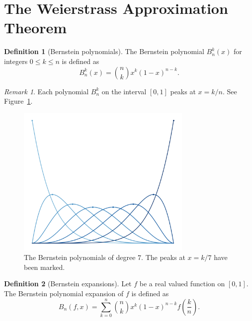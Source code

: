 \documentclass[11pt]{article}
\theoremstyle{definition}
\newtheorem{definition}{Definition}[section]
\theoremstyle{remark}
\newtheorem*{remark}{Remark}
\begin{document}
    \section{The Weierstrass Approximation Theorem}
    \begin{definition}[Bernstein polynomials]
        The Bernstein polynomial $B_n^k(x)$ for integers $0 \leq k \leq n$ is defined
        as \[
            B_n^k(x) = \binom{n}{k} x^k (1 - x)^{n - k}.
        \] 
    \end{definition}
    \begin{remark}
        Each polynomial $B_n^k$ on the interval $[0, 1]$ peaks at $x = k / n$. See
        Figure~\ref{fig:bernstein_7}.
    \end{remark}
    \begin{figure}
        \centering
        \includegraphics[width=0.75\textwidth]{./img/bernstein_7.png}
        \caption{The Bernstein polynomials of degree $7$. The peaks at $x = k / 7$ have
        been marked.}
        \label{fig:bernstein_7}
    \end{figure}

    \begin{definition}[Bernstein expansions]
        Let $f$ be a real valued function on $[0, 1]$. The Bernstein polynomial
        expansion of $f$ is defined as \[
            B_n(f, x) = \sum_{k = 0}^n \binom{n}{k} x^k(1 - x)^{n - k}f\left(
            \frac{k}{n} \right).
        \]
    \end{definition}
\end{document}
